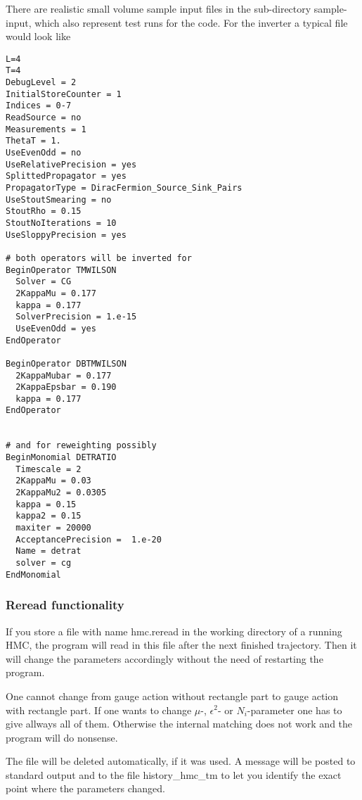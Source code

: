 There are realistic small volume sample input files in the
sub-directory {\ttfamily sample-input}, which also represent test runs
for the code. For the inverter a typical file would look like
\begin{verbatim}
L=4
T=4
DebugLevel = 2
InitialStoreCounter = 1
Indices = 0-7
ReadSource = no
Measurements = 1
ThetaT = 1.
UseEvenOdd = no
UseRelativePrecision = yes
SplittedPropagator = yes
PropagatorType = DiracFermion_Source_Sink_Pairs
UseStoutSmearing = no
StoutRho = 0.15
StoutNoIterations = 10
UseSloppyPrecision = yes

# both operators will be inverted for
BeginOperator TMWILSON
  Solver = CG
  2KappaMu = 0.177
  kappa = 0.177
  SolverPrecision = 1.e-15
  UseEvenOdd = yes
EndOperator

BeginOperator DBTMWILSON
  2KappaMubar = 0.177
  2KappaEpsbar = 0.190
  kappa = 0.177
EndOperator


# and for reweighting possibly
BeginMonomial DETRATIO
  Timescale = 2
  2KappaMu = 0.03
  2KappaMu2 = 0.0305
  kappa = 0.15
  kappa2 = 0.15
  maxiter = 20000
  AcceptancePrecision =  1.e-20
  Name = detrat
  solver = cg
EndMonomial

\end{verbatim}

\subsubsection{Reread functionality}

If you store a file with name {\ttfamily hmc.reread} in the working
directory of a running HMC, the program will read in this file after
the next finished trajectory. Then it will change the parameters
accordingly without the need of restarting the program. 

One cannot change from gauge action without rectangle part to gauge
action with rectangle part. If one wants to change $\mu$-,
$\epsilon^2$- or $N_i$-parameter one has to give allways all of
them. Otherwise the internal matching does not work and the program
will do nonsense.

The file will be deleted automatically, if it was used. A message will
be posted to standard output and to the file {\ttfamily
  history\_hmc\_tm} to let you identify the exact point where the
parameters changed.

